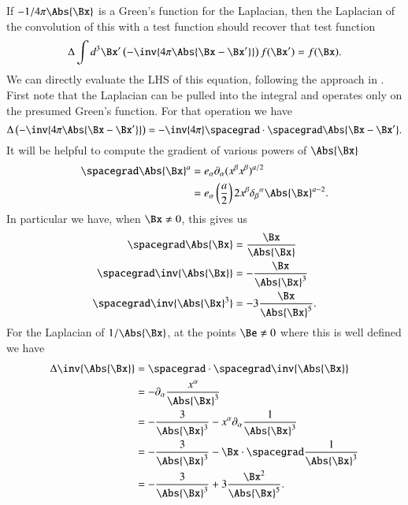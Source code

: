 If \(-1/{4 \pi \Abs{\Bx} }\) is a Green's function for the Laplacian, then the Laplacian of the convolution of this with a test function should recover that test function
%
\begin{equation}\label{eqn:relativisticElectrodynamicsL18:133}
\Delta \int d^3 \Bx' \left(-\inv{4 \pi \Abs{\Bx - \Bx'} } \right) f(\Bx') = f(\Bx).
\end{equation}
%
We can directly evaluate the LHS of this equation, following the approach in \citep{schwartz1987pe}.  First note that the Laplacian can be pulled into the integral and operates only on the presumed Green's function.  For that operation we have
%
\begin{equation}\label{eqn:relativisticElectrodynamicsL18:134}
\Delta \left(-\inv{4 \pi \Abs{\Bx - \Bx'} } \right)
=
-\inv{4 \pi} \spacegrad \cdot \spacegrad \Abs{\Bx - \Bx'}.
\end{equation}
%
It will be helpful to compute the gradient of various powers of \(\Abs{\Bx}\)
%
\begin{equation}\label{eqn:relativisticElectrodynamicsL18:780}
\begin{aligned}
\spacegrad \Abs{\Bx}^a
&=
e_\alpha \partial_\alpha (x^\beta x^\beta)^{a/2} \\
&=
e_\alpha \left(\frac{a}{2}\right) 2 x^\beta {\delta_\beta}^\alpha \Abs{\Bx}^{a - 2}.
\end{aligned}
\end{equation}
%
In particular we have, when \(\Bx \ne 0\), this gives us
%
\begin{equation}\label{eqn:relativisticElectrodynamicsL18:135}
\begin{aligned}
\spacegrad \Abs{\Bx} &= \frac{\Bx}{\Abs{\Bx}} \\
\spacegrad \inv{\Abs{\Bx}} &= -\frac{\Bx}{\Abs{\Bx}^3} \\
\spacegrad \inv{\Abs{\Bx}^3} &= -3 \frac{\Bx}{\Abs{\Bx}^5}.
\end{aligned}
\end{equation}
%
For the Laplacian of \(1/\Abs{\Bx}\), at the points \(\Be \ne 0\) where this is well defined we have
%
\begin{equation}\label{eqn:relativisticElectrodynamicsL18:800}
\begin{aligned}
\Delta \inv{\Abs{\Bx}}
&=
\spacegrad \cdot \spacegrad \inv{\Abs{\Bx}} \\
&=
-\partial_\alpha \frac{x^\alpha}{\Abs{\Bx}^3} \\
&=
-\frac{3}{\Abs{\Bx}^3}
- x^\alpha \partial_\alpha \frac{1}{\Abs{\Bx}^3} \\
&=
-\frac{3}{\Abs{\Bx}^3}
- \Bx \cdot \spacegrad \frac{1}{\Abs{\Bx}^3} \\
&=
-\frac{3}{\Abs{\Bx}^3}
+ 3 \frac{\Bx^2}{\Abs{\Bx}^5}.
\end{aligned}
\end{equation}
